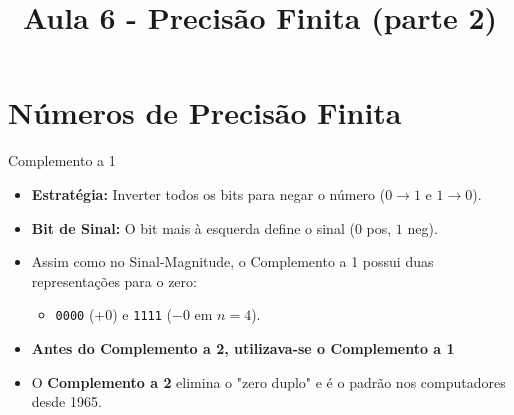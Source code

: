 \section{Números de Precisão Finita}
\title{Aula 6 - Precisão Finita (parte 2)}
\begin{frame}
    \titlepage
\end{frame}

\begin{frame}{Complemento a 1}

    \begin{itemize}
        \item \textbf{Estratégia:} Inverter todos os bits para negar o número ($0 \rightarrow 1$ e $1 \rightarrow 0$).
        \item \textbf{Bit de Sinal:} O bit mais à esquerda define o sinal ($0$ pos, $1$ neg).



        \item Assim como no Sinal-Magnitude, o Complemento a 1 possui {\color{red}duas representações para o zero}:
              \begin{itemize}
                  \item \texttt{0000} ($+0$) e \texttt{1111} ($-0$ em $n=4$).
              \end{itemize}

        \item  \textbf{Antes do Complemento a 2, utilizava-se o Complemento a 1}

        \item  O \textbf{Complemento a 2} elimina o "zero duplo" e é o padrão nos computadores desde 1965.

    \end{itemize}
\end{frame}

